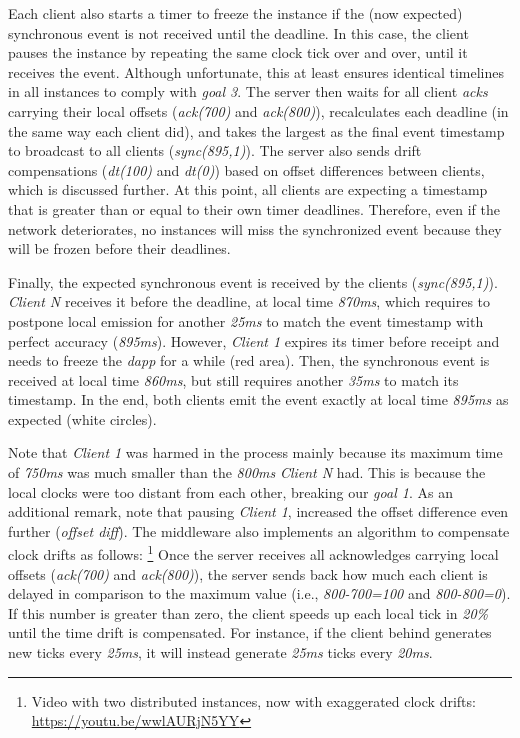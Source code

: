 \documentclass[sigplan,screen]{acmart}
\newcommand{\dapp}{\emph{dapp}\xspace}
\begin{document}
Each client also starts a timer to freeze the instance if the (now expected)
synchronous event is not received until the deadline.
In this case, the client pauses the instance by repeating the same clock tick
over and over, until it receives the event.
Although unfortunate, this at least ensures identical timelines in all
instances to comply with \emph{goal 3}.
%
The server then waits for all client \emph{acks} carrying their local offsets
(\emph{ack(700)} and \emph{ack(800)}), recalculates each deadline (in the same
way each client did), and takes the largest as the final event timestamp to
broadcast to all clients (\emph{sync(895,1)}).
The server also sends drift compensations (\emph{dt(100)} and \emph{dt(0)})
based on offset differences between clients, which is discussed further.
At this point, all clients are expecting a timestamp that is greater than or
equal to their own timer deadlines.
Therefore, even if the network deteriorates, no instances will miss the
synchronized event because they will be frozen before their deadlines.

Finally, the expected synchronous event is received by the clients
(\emph{sync(895,1)}).
\emph{Client N} receives it before the deadline, at local time \emph{870ms},
which requires to postpone local emission for another \emph{25ms} to match the
event timestamp with perfect accuracy (\emph{895ms}).
However, \emph{Client 1} expires its timer before receipt and needs to freeze
the \dapp for a while (red area).
Then, the synchronous event is received at local time \emph{860ms}, but still
requires another \emph{35ms} to match its timestamp.
In the end, both clients emit the event exactly at local time \emph{895ms} as
expected (white circles).

Note that \emph{Client 1} was harmed in the process mainly because its maximum
time of \emph{750ms} was much smaller than the \emph{800ms} \emph{Client N}
had.
This is because the local clocks were too distant from each other, breaking our
\emph{goal 1}.
As an additional remark, note that pausing \emph{Client 1}, increased the
offset difference even further (\emph{offset diff}).
%
The middleware also implements an algorithm to compensate clock drifts as
follows:%
\footnote {
    Video with two distributed instances, now with exaggerated clock drifts:
    \url{https://youtu.be/wwlAURjN5YY}
}
Once the server receives all acknowledges carrying local offsets
(\emph{ack(700)} and \emph{ack(800)}), the server sends back how much each
client is delayed in comparison to the maximum value (i.e., \emph{800-700=100}
and \emph{800-800=0}).
If this number is greater than zero, the client speeds up each local tick in
\emph{20\%} until the time drift is compensated.
For instance, if the client behind generates new ticks every \emph{25ms}, it
will instead generate \emph{25ms} ticks every \emph{20ms}.
\end{document}
